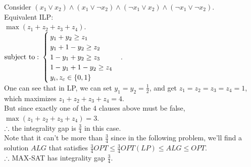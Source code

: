 \begin{pr}
Consider $(x_1\lor x_2)\land(x_1\lor\neg x_2)\land(\neg x_1\lor x_2)\land(\neg x_1\lor\neg x_2)$.\\
Equivalent ILP:\\
$\max(z_1+z_2+z_3+z_4)$.\\
$\mathrm{subject\ to:\ }\begin{cases}
y_1+y_2\geq z_1\\
y_1+1-y_2\geq z_2\\
1-y_1+y_2\geq z_3\\
1-y_1+1-y_2\geq z_4\\
y_i, z_c\in\{0, 1\}
\end{cases}$.\\
One can see that in LP, we can set $y_1=y_2=\frac12$, and get $z_1=z_2=z_3=z_4=1$, which maximizes $z_1+z_2+z_3+z_4=4$.\\
But since exactly one of the $4$ clauses above must be false, $\max(z_1+z_2+z_3+z_4)=3$.\\
$\therefore$ the integrality gap is $\frac34$ in this case.\\
Note that it can't be more than $\frac34$ since in the following problem, we'll find a solution $ALG$ that satisfies $\frac34OPT\leq\frac34OPT(LP)\leq ALG\leq OPT$.\\
$\therefore$ MAX-SAT has integrality gap $\frac34$.
\end{pr}
